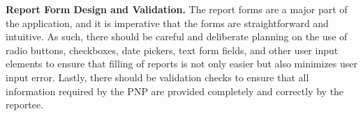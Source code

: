 \textbf{Report Form Design and Validation.} 
The report forms are a major part of the application, and it is imperative that the forms are  straightforward and intuitive. As such, there should be careful and deliberate planning on the use of radio buttons, checkboxes, date pickers, text form fields, and other user input elements to ensure that filling of reports is not only easier but also minimizes user input error. Lastly, there should be validation checks to ensure that all information required by the PNP are provided completely and correctly by the reportee.